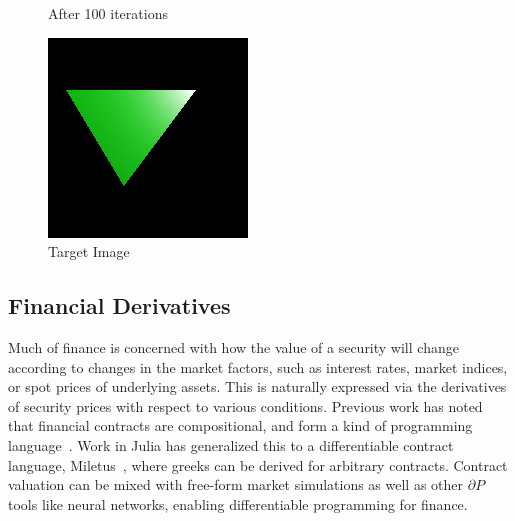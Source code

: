 \documentclass{juliacon}
\begin{document}
\begin{figure}[!htb]
  \caption{After 100 iterations}\label{fig:raytracer2}
\endminipage\hfill
{}%
  \includegraphics[width=\linewidth]{images/triangle_original.jpg}
  \caption{Target Image}\label{fig:raytracer3}
\endminipage
\end{figure}


\subsection{Financial Derivatives}

Much of finance is concerned with how the value of a security will change according to changes in the market factors, such as interest rates, market indices, or spot prices of underlying assets. This is naturally expressed via the derivatives of security prices with respect to various conditions. Previous work has noted that financial contracts are compositional, and form a kind of programming language~\cite{jones2000composing,jones2003write}. Work in Julia has generalized this to a differentiable contract language, Miletus~\cite{Miletus.jl-2019}, where greeks can be derived for arbitrary contracts. Contract valuation can be mixed with free-form market simulations as well as other $\partial P$ tools like neural networks, enabling differentiable programming for finance.
\end{document}
